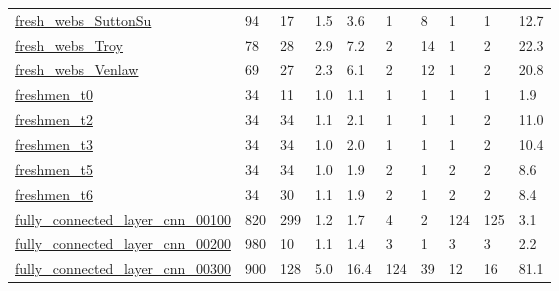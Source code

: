 \begin{longtable}{llllllllll}
 \href{https://iwdb.nceas.ucsb.edu/html/thomps_towns.html}{fresh\_webs\_SuttonSu}                                             & 94         & 17    & 1.5    & 3.6    & 1     & 8      & 1      & 1      & 12.7    \\
 \href{https://iwdb.nceas.ucsb.edu/html/thomps_towns.html}{fresh\_webs\_Troy}                                                 & 78         & 28    & 2.9    & 7.2    & 2     & 14     & 1      & 2      & 22.3    \\
 \href{https://iwdb.nceas.ucsb.edu/html/thomps_towns.html}{fresh\_webs\_Venlaw}                                               & 69         & 27    & 2.3    & 6.1    & 2     & 12     & 1      & 2      & 20.8    \\
 \href{http://www.stats.ox.ac.uk/~snijders/siena/Zeggelink_data.htm}{freshmen\_t0}                                           & 34         & 11    & 1.0    & 1.1    & 1     & 1      & 1      & 1      & 1.9     \\
 \href{http://www.stats.ox.ac.uk/~snijders/siena/Zeggelink_data.htm}{freshmen\_t2}                                           & 34         & 34    & 1.1    & 2.1    & 1     & 1      & 1      & 2      & 11.0    \\
 \href{http://www.stats.ox.ac.uk/~snijders/siena/Zeggelink_data.htm}{freshmen\_t3}                                           & 34         & 34    & 1.0    & 2.0    & 1     & 1      & 1      & 2      & 10.4    \\
 \href{http://www.stats.ox.ac.uk/~snijders/siena/Zeggelink_data.htm}{freshmen\_t5}                                           & 34         & 34    & 1.0    & 1.9    & 2     & 1      & 2      & 2      & 8.6     \\
 \href{http://www.stats.ox.ac.uk/~snijders/siena/Zeggelink_data.htm}{freshmen\_t6}                                           & 34         & 30    & 1.1    & 1.9    & 2     & 1      & 2      & 2      & 8.4     \\
 \href{https://github.com/gabrieleilertsen/nws}{fully\_connected\_layer\_cnn\_00100}                                            & 820        & 299   & 1.2    & 1.7    & 4     & 2      & 124    & 125    & 3.1     \\
 \href{https://github.com/gabrieleilertsen/nws}{fully\_connected\_layer\_cnn\_00200}                                            & 980        & 10    & 1.1    & 1.4    & 3     & 1      & 3      & 3      & 2.2     \\
 \href{https://github.com/gabrieleilertsen/nws}{fully\_connected\_layer\_cnn\_00300}                                            & 900        & 128   & 5.0    & 16.4   & 124   & 39     & 12     & 16     & 81.1    \\

\end{longtable}
